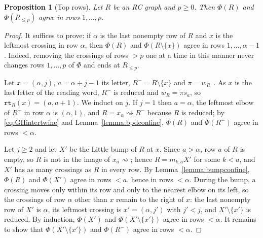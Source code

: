 \documentclass{amsart}
\newtheorem{proposition}[lemma]{Proposition}
\theoremstyle{definition}
\theoremstyle{remark}
\numberwithin{equation}{subsection}
\newcommand{\wof}[1]{w_{#1}}
\newcommand{\rtt}{\mathtt{rt}}
\begin{document}
\begin{proposition}[Top rows]\label{proposition:toprows}
Let $R$ be an RC graph and $p\geq 0$. Then $\Phi(R)$ and $\Phi(R_{\leq p})$ agree in rows $1,\ldots,p$.
\end{proposition}
\begin{proof}
It suffices to prove: if $\alpha$ is the last nonempty row of $R$ and $x$ is the leftmost crossing in row $\alpha$, then $\Phi(R)$ and $\Phi(R\setminus\{x\})$ agree in rows $1,\ldots,\alpha-1$. Indeed, removing the crossings of rows $>p$ one at a time in this manner never changes rows $1,\ldots,p$ of $\Phi$ and ends at $R_{\leq p}$.

Let $x=(\alpha,j)$, $a=\alpha+j-1$ its letter, $R^-=R\setminus\{x\}$ and $\pi=\wof{R^-}$. As $x$ is the last letter of the reading word, $R^-$ is reduced and $\wof R=\pi s_a$, so $\rtt_R(x)=(a,a+1)$. We induct on $j$. If $j=1$ then $a=\alpha$, the leftmost elbow of $R^-$ in row $\alpha$ is $(\alpha,1)$, and $R=x_\alpha\!\rightsquigarrow R^-$ because $R$ is reduced; by \eqref{eq:GHintertwine} and Lemma~\ref{lemma:bpdconfine}, $\Phi(R)$ and $\Phi(R^-)$ agree in rows $<\alpha$.

Let $j\geq 2$ and let $X'$ be the Little bump of $R$ at $x$. Since $a>\alpha$, row $a$ of $R$ is empty, so $R$ is not in the image of $x_a\!\rightsquigarrow$; hence $R=m_{k,a}X'$ for some $k<a$, and $X'$ has as many crossings as $R$ in every row. By Lemma~\ref{lemma:bumpconfine}, $\Phi(R)$ and $\Phi(X')$ agree in rows $<a$, hence in rows $<\alpha$. During the bump, a crossing moves only within its row and only to the nearest elbow on its left, so the crossings of row $\alpha$ other than $x$ remain to the right of $x$: the last nonempty row of $X'$ is $\alpha$, its leftmost crossing is $x'=(\alpha,j')$ with $j'<j$, and $X'\setminus\{x'\}$ is reduced. By induction, $\Phi(X')$ and $\Phi(X'\setminus\{x'\})$ agree in rows $<\alpha$. It remains to show that $\Phi(X'\setminus\{x'\})$ and $\Phi(R^-)$ agree in rows $<\alpha$.


\end{proof}
\end{document}
